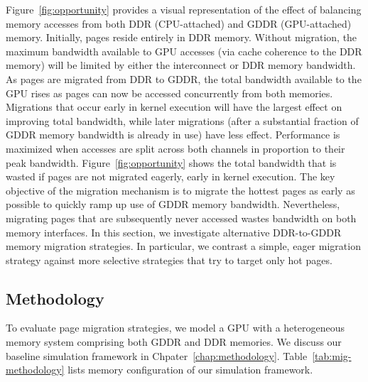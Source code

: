 Figure~\ref{fig:opportunity} provides a visual representation of the effect of
balancing memory accesses from both DDR (CPU-attached) and GDDR (GPU-attached)
memory. Initially, pages reside entirely in DDR memory.  Without migration, the
maximum bandwidth available to GPU accesses (via cache coherence to the DDR
memory)  will be limited by either the interconnect or DDR memory bandwidth.  As
pages are migrated from DDR to GDDR, the total bandwidth available to the GPU
rises as pages can now be accessed concurrently from both memories.  Migrations
that occur early in kernel execution will have the largest effect on improving
total bandwidth, while later migrations (after a substantial fraction of GDDR
memory bandwidth is already in use) have less effect.  Performance is maximized
when accesses are split across both channels in proportion to their peak
bandwidth.  Figure~\ref{fig:opportunity} shows the total bandwidth that is
wasted if pages are not migrated eagerly, early in kernel execution.  The key
objective of the migration mechanism is to migrate the hottest pages as early as
possible to quickly ramp up use of GDDR memory bandwidth.  Nevertheless,
migrating pages that are subsequently never accessed wastes bandwidth on both
memory interfaces.  In this section, we investigate alternative DDR-to-GDDR
memory migration strategies.  In particular, we contrast a simple, eager
migration strategy against more selective strategies that try to target only hot
pages.

\subsection{Methodology}
To evaluate page migration strategies, we model a GPU with a heterogeneous
memory system comprising both  GDDR and DDR memories. We discuss our baseline
simulation framework in Chpater~\ref{chap:methodology}.
%
Table~\ref{tab:mig-methodology} lists memory configuration of our simulation
framework.

